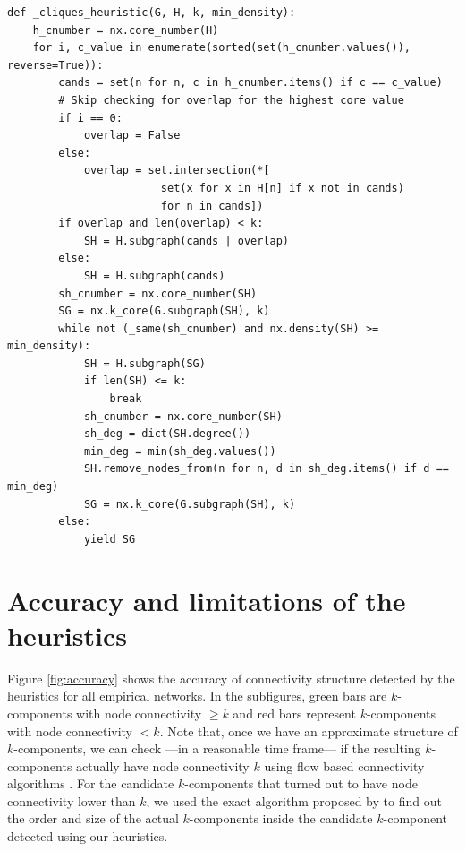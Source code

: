 \begin{scriptsize}
\begin{lstlisting}
def _cliques_heuristic(G, H, k, min_density):
    h_cnumber = nx.core_number(H)
    for i, c_value in enumerate(sorted(set(h_cnumber.values()), reverse=True)):
        cands = set(n for n, c in h_cnumber.items() if c == c_value)
        # Skip checking for overlap for the highest core value
        if i == 0:
            overlap = False
        else:
            overlap = set.intersection(*[
                        set(x for x in H[n] if x not in cands)
                        for n in cands])
        if overlap and len(overlap) < k:
            SH = H.subgraph(cands | overlap)
        else:
            SH = H.subgraph(cands)
        sh_cnumber = nx.core_number(SH)
        SG = nx.k_core(G.subgraph(SH), k)
        while not (_same(sh_cnumber) and nx.density(SH) >= min_density):
            SH = H.subgraph(SG)
            if len(SH) <= k:
                break
            sh_cnumber = nx.core_number(SH)
            sh_deg = dict(SH.degree())
            min_deg = min(sh_deg.values())
            SH.remove_nodes_from(n for n, d in sh_deg.items() if d == min_deg)
            SG = nx.k_core(G.subgraph(SH), k)
        else:
            yield SG
\end{lstlisting}
\end{scriptsize}

\newpage

\section{Accuracy and limitations of the heuristics}
\label{accuracy}

Figure \ref{fig:accuracy} shows the accuracy of connectivity structure detected by the heuristics for all empirical networks. In the subfigures, green bars are $k$-components with node connectivity $\ge k$ and red bars represent $k$-components with node connectivity $< k$.  Note that, once we have an approximate structure of $k$-components, we can check ---in a reasonable time frame--- if the resulting $k$-components actually have node connectivity $k$ using flow based connectivity algorithms \citep[chapter 7]{brandes:2005}. For the candidate $k$-components that turned out to have node connectivity lower than $k$, we used the exact algorithm proposed by \citet{moody:2003} to find out the order and size of the actual $k$-components inside the candidate $k$-component detected using our heuristics.

